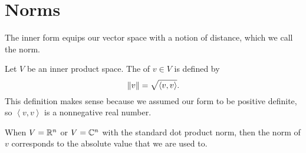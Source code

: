 \section{Norms}

The inner form equips our vector space with a notion of distance, which we call the norm.
\begin{definition}
	Let $V$ be an inner product space.
	The  of $v \in V$ is defined by 
	\[ \left\lVert v \right\rVert = \sqrt{\left<v,v\right>}. \]
	This definition makes sense because we assumed our form to be positive definite,
	so $\left< v,v\right>$ is a nonnegative real number.
\end{definition}

\begin{example}
	When $V = \mathbb R^n$ or $V = \mathbb C^n$ with the standard dot product norm,
	then the norm of $v$ corresponds to the absolute value that we are used to.
\end{example}


